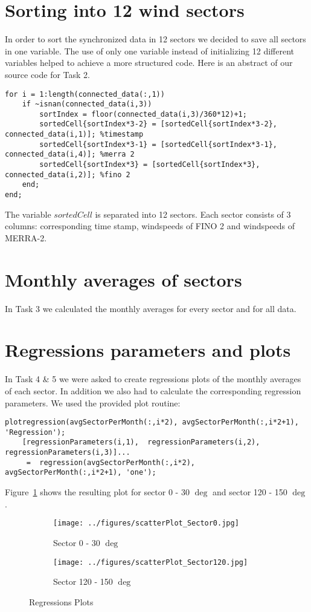 \documentclass[10pt]{article}
\begin{document}
\section{Sorting into 12 wind sectors}
In order to sort the synchronized data in 12 sectors we decided to save all sectors in one variable. The use of only one variable instead of initializing 12 different variables helped to achieve a more structured code.
Here is an abstract of our source code for Task 2.
\begin{lstlisting}
for i = 1:length(connected_data(:,1))
    if ~isnan(connected_data(i,3))
        sortIndex = floor(connected_data(i,3)/360*12)+1;
        sortedCell{sortIndex*3-2} = [sortedCell{sortIndex*3-2}, connected_data(i,1)]; %timestamp
        sortedCell{sortIndex*3-1} = [sortedCell{sortIndex*3-1}, connected_data(i,4)]; %merra 2
        sortedCell{sortIndex*3} = [sortedCell{sortIndex*3}, connected_data(i,2)]; %fino 2
    end;
end;
\end{lstlisting} 
The variable $sortedCell$ is separated into 12 sectors. Each sector consists of 3 columns: corresponding time stamp, windspeeds of FINO 2 and windspeeds of MERRA-2.
\section{Monthly averages of sectors}
In Task 3 we calculated the monthly averages for every sector and for all data. 
\section{Regressions parameters and plots} 
In Task 4 \& 5 we were asked to create regressions plots of the monthly averages of each sector. In addition we also had to calculate the corresponding regression parameters. We used the provided plot routine:
\begin{lstlisting}
plotregression(avgSectorPerMonth(:,i*2), avgSectorPerMonth(:,i*2+1), 'Regression');
    [regressionParameters(i,1),  regressionParameters(i,2), regressionParameters(i,3)]...
     =  regression(avgSectorPerMonth(:,i*2), avgSectorPerMonth(:,i*2+1), 'one');

\end{lstlisting}
Figure~\ref{fig:Regression} shows the resulting plot for sector 0 - 30 $\deg$ and sector 120 - 150 $\deg$.
\begin{figure}[H]
\begin{subfigure}{0.5\textwidth}
  \centering
  \texttt{[image: ../figures/scatterPlot\_Sector0.jpg]}
  \caption{Sector 0 - 30 $\deg$}
\end{subfigure}
\begin{subfigure}{0.5\textwidth}
  \centering
  \texttt{[image: ../figures/scatterPlot\_Sector120.jpg]}
  \caption{Sector 120 - 150 $\deg$}
\end{subfigure}
  \caption{Regressions Plots}
\label{fig:Regression}
\end{figure}
\end{document}
